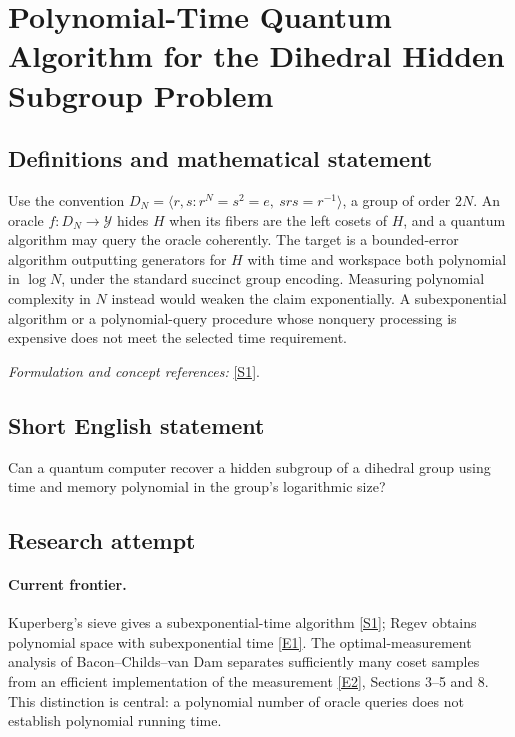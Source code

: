 \documentclass[11pt,a4paper]{article}
\newcommand{\sref}[2]{\hyperlink{source:#1:#2}{[S#2]}}
\newcommand{\eref}[2]{\hyperlink{extra:#1:#2}{[E#2]}}
\newif\ifshowcatalogue
\newcommand{\cataloguescope}[1]{\ifshowcatalogue
 \paragraph{Exact scope in the supplied catalogue.}
 \begin{quote}\small #1\end{quote}\fi}
\begin{document}
\setcounter{section}{0}
\clearpage
\section*{\texorpdfstring{Polynomial-Time Quantum Algorithm for the Dihedral Hidden Subgroup Problem}{Polynomial-Time Quantum Algorithm for the Dihedral Hidden Subgroup Problem}}\label{statement}
\subsection{Definitions and mathematical statement}
Use the convention
$D_N=\langle r,s:r^N=s^2=e,\ srs=r^{-1}\rangle$, a group of order $2N$. An oracle $f:D_N\to\mathcal Y$ hides $H$ when its fibers are the left cosets of $H$, and a quantum algorithm may query the oracle coherently. The target is a bounded-error algorithm outputting generators for $H$ with time and workspace both polynomial in $\log N$, under the standard succinct group encoding. Measuring polynomial complexity in $N$ instead would weaken the claim exponentially. A subexponential algorithm or a polynomial-query procedure whose nonquery processing is expensive does not meet the selected time requirement.
\par\smallskip\textit{Formulation and concept references:} \sref{statement}{1}.
\cataloguescope{Find a polynomial-time quantum algorithm with poly(log N) operations and space for the hidden subgroup problem in dihedral groups D\_N.}
\subsection{Short English statement}
Can a quantum computer recover a hidden subgroup of a dihedral group using time and memory polynomial in the group's logarithmic size?
\subsection{Research attempt}

\paragraph{Current frontier.}
Kuperberg's sieve gives a subexponential-time algorithm \sref{statement}{1};
Regev obtains polynomial space with subexponential time \eref{statement}{1}.
The optimal-measurement analysis of Bacon--Childs--van Dam separates
sufficiently many coset samples from an efficient implementation of the
measurement \eref{statement}{2}, Sections 3--5 and 8. This distinction is central:
a polynomial number of oracle queries does not establish polynomial
running time.
\end{document}
